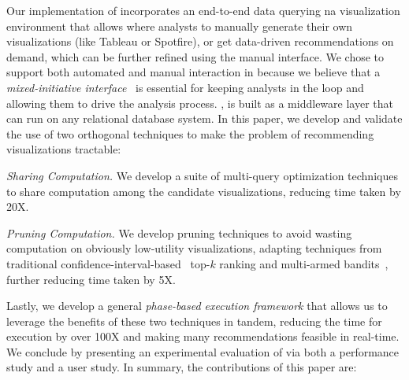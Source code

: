 Our implementation of \SeeDB incorporates an end-to-end data querying na 
visualization environment that allows where analysts to manually generate 
their own visualizations (like Tableau or Spotfire), or get data-driven recommendations on demand, which
can be further refined using the manual interface.
We chose to support both automated and manual interaction in \SeeDB because we 
believe that a {\em mixed-initiative interface}~\cite{mixed_initiative} is essential for keeping 
analysts in the loop and allowing them to drive the analysis process.
\SeeDB, is built as a middleware layer that can run on any 
relational database system.
In this paper, we develop and validate the use of  
two orthogonal techniques to make the problem
of recommending visualizations tractable:
\begin{denselist}
\item {\em Sharing Computation.} 
We develop a suite of multi-query optimization techniques to share computation
among the candidate visualizations,
reducing time taken by 20X.
\item {\em Pruning Computation.}
We develop pruning techniques to avoid wasting computation
on obviously low-utility visualizations, adapting
techniques from traditional 
  confidence-interval-based~\cite{hoeffding1963probability} 
  top-$k$ ranking and
  multi-armed bandits~\cite{bandits},
  further reducing time taken by 5X.
\end{denselist}
Lastly, we develop a general {\em phase-based execution framework}
that allows us to leverage the benefits of these two techniques
in tandem, reducing the time for execution by over 100X and
making many recommendations feasible in real-time.
We conclude by presenting an experimental evaluation of \SeeDB 
via both a performance study and a user study.
In summary, the contributions of this paper are:


